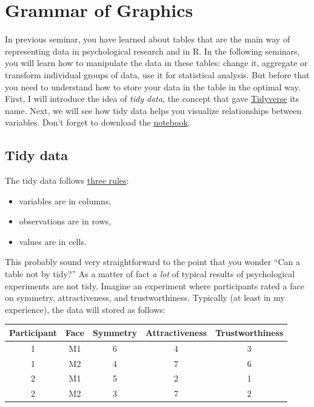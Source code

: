 \documentclass[
]{book}
\providecommand{\tightlist}{%
  \setlength{\itemsep}{0pt}\setlength{\parskip}{0pt}}
\begin{document}
\hypertarget{ggplot2}{%
\chapter{Grammar of Graphics}\label{ggplot2}}

In previous seminar, you have learned about tables that are the main way of representing data in psychological research and in R. In the following seminars, you will learn how to manipulate the data in these tables: change it, aggregate or transform individual groups of data, use it for statistical analysis. But before that you need to understand how to store your data in the table in the optimal way. First, I will introduce the idea of \emph{tidy data}, the concept that gave \href{https://www.tidyverse.org/}{Tidyverse} its name. Next, we will see how tidy data helps you visualize relationships between variables. Don't forget to download the \href{notebooks/Seminar\%2005\%20-\%20ggplot2.Rmd}{notebook}.

\hypertarget{tidydata}{%
\section{Tidy data}\label{tidydata}}

The tidy data follows \href{https://r4ds.had.co.nz/tidy-data.html}{three rules}:

\begin{itemize}
\tightlist
\item
  variables are in columns,
\item
  observations are in rows,
\item
  values are in cells.
\end{itemize}

This probably sound very straightforward to the point that you wonder ``Can a table not by tidy?'' As a matter of fact \emph{a lot} of typical results of psychological experiments are not tidy. Imagine an experiment where participants rated a face on symmetry, attractiveness, and trustworthiness. Typically (at least in my experience), the data will stored as follows:

\begin{tabular}{c|c|c|c|c}
\hline
Participant & Face & Symmetry & Attractiveness & Trustworthiness\\
\hline
1 & M1 & 6 & 4 & 3\\
\hline
1 & M2 & 4 & 7 & 6\\
\hline
2 & M1 & 5 & 2 & 1\\
\hline
2 & M2 & 3 & 7 & 2\\
\hline
\end{tabular}
\end{document}
